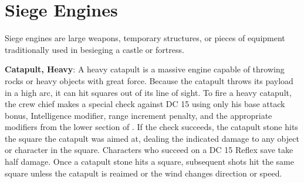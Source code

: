 \section{Siege Engines}
Siege engines are large weapons, temporary structures, or pieces of equipment traditionally used in besieging a castle or fortress.



\textbf{Catapult, Heavy}: A heavy catapult is a massive engine capable of throwing rocks or heavy objects with great force. Because the catapult throws its payload in a high arc, it can hit squares out of its line of sight. To fire a heavy catapult, the crew chief makes a special check against DC 15 using only his base attack bonus, Intelligence modifier, range increment penalty, and the appropriate modifiers from the lower section of . If the check succeeds, the catapult stone hits the square the catapult was aimed at, dealing the indicated damage to any object or character in the square. Characters who succeed on a DC 15 Reflex save take half damage. Once a catapult stone hits a square, subsequent shots hit the same square unless the catapult is reaimed or the wind changes direction or speed.


